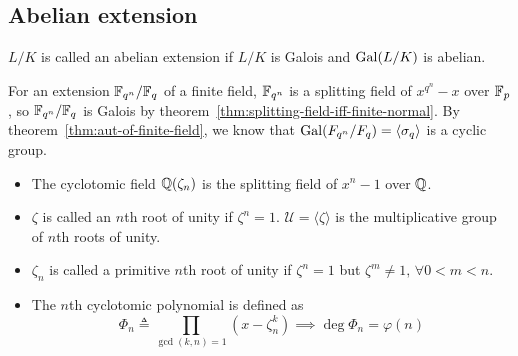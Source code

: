 \subsection{Abelian extension}

\begin{definition}
  $L/K$ is called an abelian extension if $L/K$ is Galois and $\operatorname{Gal}(L/K)$ is abelian.
\end{definition}

\begin{example}
  For an extension $\mathbb{F}_{q^n} / \mathbb{F}_q$ of a finite field, $\mathbb{F}_{q^n}$ is a splitting field of $x^{q^n}-x$
  over $\mathbb{F}_p$, so $\mathbb{F}_{q^n} / \mathbb{F}_q$ is Galois by theorem~\ref{thm:splitting-field-iff-finite-normal}.
  By theorem~\ref{thm:aut-of-finite-field}, we know that $\operatorname{Gal}(F_{q^n} / F_q) = \langle \sigma_q \rangle$
  is a cyclic group.
\end{example}

\begin{definition} \hfill
  \begin{itemize}
    \item The cyclotomic field $\mathbb{Q}(\zeta_n)$ is the splitting field of $x^n - 1$ over $\mathbb{Q}$.
    \item $\zeta$ is called an $n$th root of unity if $\zeta^n = 1$. $\mathcal{U} = \langle \zeta \rangle$
      is the multiplicative group of $n$th roots of unity.
    \item $\zeta_n$ is called a primitive $n$th root of unity if $\zeta^n = 1$ but $\zeta^m \ne 1, \, \forall 0 < m < n$.
    \item The $n$th cyclotomic polynomial is defined as
      \[ \Phi_n \triangleq \prod_{\gcd(k, n) = 1} (x - \zeta_n^k) \implies \deg \Phi_n = \varphi(n) \]
  \end{itemize}
\end{definition}

